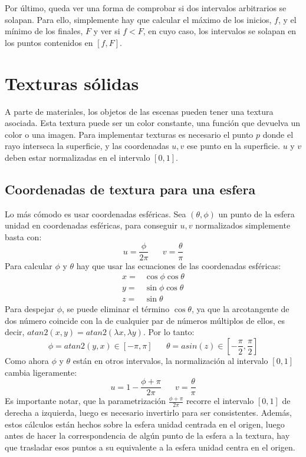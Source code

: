 Por último, queda ver una forma de comprobar si dos intervalos arbitrarios se solapan. Para ello, simplemente hay que calcular el máximo de los inicios, $f$, y el mínimo de los finales, $F$ y ver si $f<F$, en cuyo caso, los intervalos se solapan en los puntos contenidos en $[f,F]$. 

\section{Texturas sólidas}

A parte de materiales, los objetos de las escenas pueden tener una textura asociada. Esta textura puede ser un color constante, una función que devuelva un color o una imagen. Para implementar texturas es necesario el punto $p$ donde el rayo interseca la superficie, y las coordenadas $u,v$ ese punto en la superficie. $u$ y $v$ deben estar normalizadas en el intervalo $[0,1]$.

\subsection{Coordenadas de textura para una esfera}

Lo más cómodo es usar coordenadas esféricas. Sea $(\theta,\phi)$ un punto de la esfera unidad en coordenadas esféricas, para conseguir $u,v$ normalizados simplemente basta con:
\[
u=\frac{\phi}{2\pi} \;\;\;\;\;\; v=\frac{\theta}{\pi}
\]
Para calcular $\phi$ y $\theta$ hay que usar las ecuaciones de las coordenadas esféricas:
\[
\begin{array}{rl}
x = & \cos\phi\cos\theta\\
y = & \sin\phi\cos\theta\\
z = & \sin\theta
\end{array}
\]
Para despejar $\phi$, se puede eliminar el término $\cos\theta$, ya que la arcotangente de dos número coincide con la de cualquier par de números múltiplos de ellos, es decir, $atan2(x,y)=atan2(\lambda x, \lambda y)$. Por lo tanto:
\[
\phi=atan2(y,x)\in[-\pi,\pi] \;\;\;\;\;\; \theta=asin(z)\in\left[-\frac{\pi}{2},\frac{\pi}{2}\right]
\]
Como ahora $\phi$ y $\theta$ están en otros intervalos, la normalización al intervalo $[0,1]$ cambia ligeramente:
\[
u=1-\frac{\phi+\pi}{2\pi} \;\;\;\;\;\; v=\frac{\theta}{\pi}
\]
Es importante notar, que la parametrización $\frac{\phi+\pi}{2\pi}$ recorre el intervalo $[0,1]$ de derecha a izquierda, luego es necesario invertirlo para ser consistentes. Además, estos cálculos están hechos sobre la esfera unidad centrada en el origen, luego antes de hacer la correspondencia de algún punto de la esfera a la textura, hay que trasladar esos puntos a su equivalente a la esfera unidad centra en el origen.

